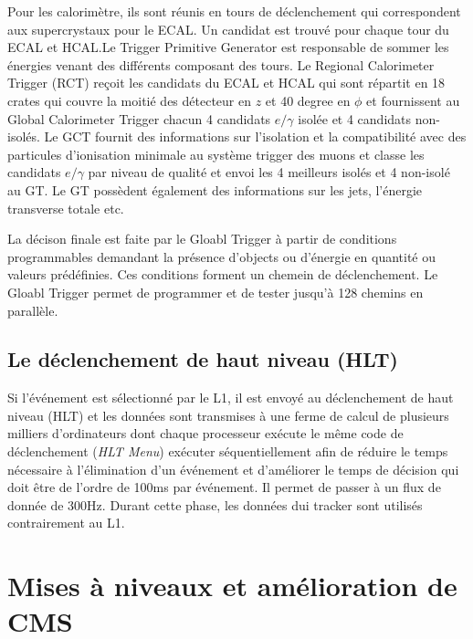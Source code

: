 Pour les calorimètre, ils sont réunis en tours de déclenchement qui correspondent aux supercrystaux pour le ECAL. Un candidat est trouvé pour chaque tour du ECAL et HCAL.Le Trigger Primitive Generator est responsable de sommer les énergies venant des différents composant des tours.  Le Regional Calorimeter Trigger (RCT) reçoit les candidats du ECAL et HCAL qui sont répartit en 18 crates qui couvre la moitié des détecteur en $z$ et 40 degree en $\phi$ et fournissent au Global Calorimeter Trigger chacun 4 candidats $e/\gamma$ isolée et 4 candidats non-isolés. Le GCT fournit des informations sur l'isolation et la compatibilité avec des particules d'ionisation minimale au système trigger des muons et classe les candidats $e/\gamma$ par niveau de qualité et envoi les 4 meilleurs isolés et 4 non-isolé au GT. Le GT possèdent également des informations sur les jets, l'énergie transverse totale etc.

La décison finale est faite par le Gloabl Trigger à partir de conditions programmables demandant la présence d'objects ou d'énergie en quantité ou valeurs prédéfinies. Ces conditions forment un chemein de déclenchement. Le Gloabl Trigger permet de programmer et de tester jusqu'à 128 chemins en parallèle. 

\subsection{Le déclenchement de haut niveau (HLT)}
Si l'événement est sélectionné par le L1, il est envoyé au déclenchement de haut niveau (HLT) et les données sont transmises à une ferme de calcul de plusieurs milliers d'ordinateurs  dont chaque processeur exécute le même code de déclenchement (\textit{HLT Menu}) exécuter séquentiellement afin de réduire le temps nécessaire à l'élimination d'un événement et d'améliorer le temps de décision qui doit être de l'ordre de 100ms par événement. Il permet de passer à un flux de donnée de 300Hz. Durant cette phase, les données dui tracker sont utilisés contrairement au L1.

\section{Mises à niveaux et amélioration de CMS}

